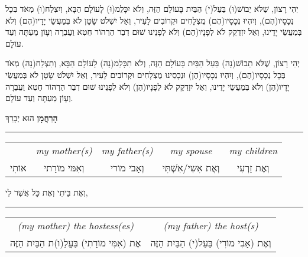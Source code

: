 \begin{minipage}[t]{0.48\linewidth}

יְהִי רָצוֹן, שֶׁלֹּא יֵבוֹשׁ(וּ) בַּעַל(י) הַבַּיִת בָּעוֹלָם הַזֶּה, וְלֹא יִכָּלֵמ(וּ) לָעוֹלָם הַבָּא, וְיִצְלַח(וּ) מְאֹד בְּכָל נְכָסָיו(הֶם), וְיִהְיוּ נְכָסָיו(הֶם) מֻצְלָחִים וּקְרוֹבִים לָעִיר, וְאַל יִשְׁלֹט שָׂטָן לֹא בְּמַעֲשֵׂי יָדָיו(הֶם) וְלֹא בְּמַעֲשֵׂי יָדֵינוּ, וְאַל יִזְדַקֵק לֹא לְפָנָיו(הֶם) וְלֹא לְפָנֵינוּ שׁוּם דְבַר הַרְהוֹר חֵטְא וַעֲבֵרָה וְעָוֹן מֵעַתָּה וְעַד עוֹלָם.
\end{minipage}\hspace{0.01\linewidth}\vrule{}\hspace{0.01\linewidth}
\begin{minipage}[t]{0.48\linewidth}

יְהִי רָצוֹן, שֶׁלֹּא תֵבוֹשׁ(נָה) בַּעַל הַבַּיִת בָּעוֹלָם הַזֶּה, וְלֹא תִכָּלֵמ(נָה) לָעוֹלָם הַבָּא, וְתִצְלַח(נָה) מְאֹד בְּכָל נְכָסָיו(הֶם), וְיִהְיוּ נְכָסָיו(הֶן) וּנְכָסֵינוּ מֻצְלָחִים וּקְרוֹבִים לָעִיר, וְאַל יִשְׁלֹט שָׂטָן לֹא בְּמַעֲשֵׂי יָדָיו(הֶן) וְלֹא בְּמַעֲשֵׂי יָדֵינוּ, וְאַל יִזְדַקֵק לֹא לְפָנָיו(הֶן) וְלֹא לְפָנֵינוּ שׁוּם דְבַר הַרְהוֹר חֵטְא וַעֲבֵרָה וְעָוֹן מֵעַתָּה וְעַד עוֹלָם.
\end{minipage}

\vspace{1em}

{\large \bf הָרַחֲמָן}
הוּא יְבָרֵךְ 
\hrule


\begin{tabular}{c c c c c}

	& \textenglish{\itshape my mother(s)}
		& \textenglish{\itshape my father(s)}
			& \textenglish{\itshape my spouse}
				& \textenglish{\itshape my children}\\
					
אוֹתִי & וְאִמּי מוֹרָתי & וְאָבי מוֹרי & וְאֶת אִשִי/אִשְׁתִּי & וְאֶת זַרְעִי \\
\end{tabular}

וְאֶת בֵּיתִי וְאֶת כָּל אֲשֶׁר לִי,

\vspace{0.1em}
\hrule
\vspace{0.1em}


\begin{tabular}{c c}
\textenglish{\itshape (my mother) the hostess(es)}
	& \textenglish{\itshape (my father) the host(s)} \\

אֶת (אִמִּי מוֹרָתִי) בַּעֲלַ(ו)ת הַבַּיִת הַזֶּה & וְאֶת (אָבִי מוֹרִי) בַּעַל(י) הַבַּיִת הַזֶּה \\
\end{tabular}

